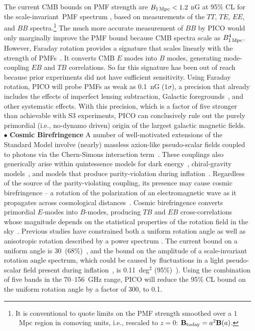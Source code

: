 \documentclass[PICOAPC.tex]{subfiles}
\begin{document}
The current CMB bounds on PMF strength are $B_{\rm 1\,Mpc}<1.2$ nG at 95\% CL for the scale-invariant~PMF spectrum \cite{Planck2015PMF,Kunze2015,Chluba2015PMF,Zucca:2016iur}, based on measurements of the $TT$, $TE$, $EE$, and $BB$ spectra.\footnote{It is conventional to quote limits on the PMF strength smoothed over a $1$~Mpc region in comoving units,  i.e., rescaled to $z=0$: $\mathbf{B}_{\rm today} = a^2\mathbf{B}(a)$.} 
The much more accurate measurement of $BB$ by PICO would only marginally improve the PMF bound because CMB spectra scale as $B^4_{\rm 1\,Mpc}$. However, Faraday rotation provides a signature that scales linearly with the strength of PMFs~\cite{Kosowsky:1996yc}. It converts CMB $E$ modes into $B$ modes, generating mode-coupling $EB$ and $TB$ correlations. So far this signature has been out of reach because prior experiments did not have sufficient sensitivity. Using Faraday rotation, PICO will probe PMFs as weak as 0.1~nG ($1\sigma$), a precision that already includes the effects of imperfect lensing subtraction, Galactic foregrounds~\cite{Oppermann:2011td,De:2013dra,Pogosian:2013dya}, and other systematic effects. With this precision, which is a factor of five stronger than achievable with S3 experiments, PICO can conclusively rule out the purely primordial (i.e., no-dynamo driven) origin of the largest galactic magnetic fields. \\
%
$\bullet$ {\bf Cosmic Birefringence} \hspace{0.1in}
A number of well-motivated extensions of the Standard Model involve (nearly) massless axion-like pseudo-scalar fields coupled to photons via the Chern-Simons interaction term~\citep{Freese:1990rb,Frieman:1995pm,Carroll:1998zi,Kaloper:2005aj}. These couplings also generically arise within quintessence models for dark energy~\citep{Carroll:1998zi}, chiral-gravity models~\citep{2008PhRvL.101n1101C}, and models that produce parity-violation during inflation~\cite{Gluscevic:2010vv}. Regardless of the source of the parity-violating coupling, its presence may cause cosmic birefringence -- a rotation of the polarization of an electromagnetic wave as it propagates across cosmological distances~\cite{Harari:1992ea,Carroll:1989vb,Carroll:1998zi}. Cosmic birefringence converts primordial $E$-modes into $B$-modes, producing $TB$ and $EB$ cross-correlations whose magnitude depends on the statistical properties of the rotation field in the sky~\cite{Kamionkowski:2008fp,Gluscevic:2009mm,Gluscevic:2012me}. Previous studies have constrained both a uniform rotation angle as well as anisotropic rotation described by a power spectrum \cite{Gluscevic:2012me}. The current bound on a uniform angle is 30\arcmin\ (68\%)~\cite{Planck2016_XLIX}, and the bound on the amplitude of a scale-invariant rotation angle spectrum, which could be caused by fluctuations in a light pseudo-scalar field present during inflation~\cite{Pospelov:2008gg}, is 0.11~deg$^2$ (95\%)~\citep{Array:2017rlf}). Using the combination of five bands in the 70--156~GHz range, PICO will reduce the 95\% CL bound on the uniform rotation angle by a factor of 300, to 0.1\arcmin.  
\end{document}
